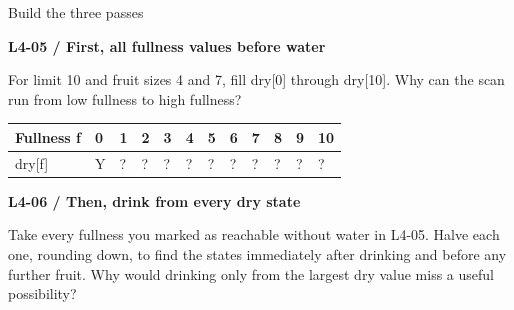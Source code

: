 \documentclass[11pt,a4paper]{article}
\begin{document}
\par\noindent\begin{minipage}{\linewidth}
{\heavy\fontsize{12}{15}\selectfont Build the three passes\par}\medskip
\textbf{L4-05 / First, all fullness values before water}\par\smallskip For limit 10 and fruit sizes 4 and 7, fill dry[0] through dry[10]. Why can the scan run from low fullness to high fullness?\par
\par\medskip \begingroup\footnotesize\setlength{\tabcolsep}{4pt}\renewcommand{\arraystretch}{1.35}\begin{tabularx}{\linewidth}{>{\raggedright\arraybackslash}l>{\raggedright\arraybackslash}X>{\raggedright\arraybackslash}X>{\raggedright\arraybackslash}X>{\raggedright\arraybackslash}X>{\raggedright\arraybackslash}X>{\raggedright\arraybackslash}X>{\raggedright\arraybackslash}X>{\raggedright\arraybackslash}X>{\raggedright\arraybackslash}X>{\raggedright\arraybackslash}X>{\raggedright\arraybackslash}X}\toprule\textbf{Fullness f} & \textbf{0} & \textbf{1} & \textbf{2} & \textbf{3} & \textbf{4} & \textbf{5} & \textbf{6} & \textbf{7} & \textbf{8} & \textbf{9} & \textbf{10}\\\midrule
dry[f] & Y & ? & ? & ? & ? & ? & ? & ? & ? & ? & ?\\
\bottomrule\end{tabularx}\endgroup\par\medskip 
\end{minipage}\par\vspace{4mm}
\par\noindent\begin{minipage}{\linewidth}
\textbf{L4-06 / Then, drink from every dry state}\par\smallskip Take every fullness you marked as reachable without water in L4-05. Halve each one, rounding down, to find the states immediately after drinking and before any further fruit. Why would drinking only from the largest dry value miss a useful possibility?\par
\end{minipage}\par\vspace{4mm}
\end{document}
